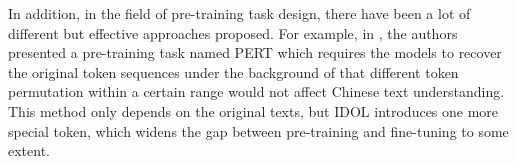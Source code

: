 \documentclass[11pt]{article}
\begin{document}
In addition, in the field of pre-training task design, there have been a lot of different but effective approaches proposed. For example, in \citet{pert}, the authors presented a pre-training task named PERT which requires the models to recover the original token sequences under the background of that different token permutation within a certain range would not affect Chinese text understanding. This method only depends on the original texts, but IDOL introduces one more special token, which widens the gap between pre-training and fine-tuning to some extent.







\appendix
\end{document}
